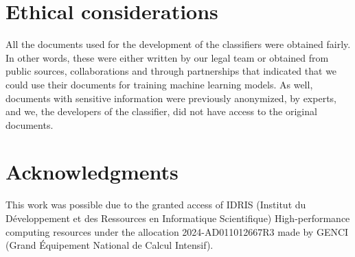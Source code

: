 \documentclass[11pt]{article}
\newcommand{\filluptopage}[1]{%
  \clearpage
  \loop\ifnum\value{page}<#1\relax
    \null\clearpage
  \repeat
}
\begin{document}

\section*{Ethical considerations}

    All the documents used for the development of the classifiers were obtained fairly. In other words, these were either written by our legal team or obtained from public sources, collaborations and through partnerships that indicated that we could use their documents for training machine learning models. As well, documents with sensitive information were previously anonymized, by experts, and we, the developers of the classifier, did not have access to the original documents. 

\section*{Acknowledgments}
    This work was possible due to the granted access of IDRIS (Institut du Développement et des Ressources en Informatique Scientifique) High-performance computing resources under the allocation 2024-AD011012667R3 made by GENCI (Grand Équipement National de Calcul Intensif).

%

\end{document}
